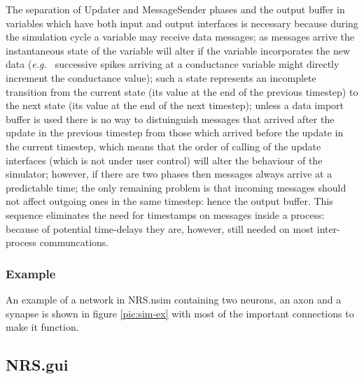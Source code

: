 \documentclass[pdftex,a4paper]{article}
\newif\ifpdf
\newcommand{\eg}{{\em e.g.\ }}
\begin{document}
The separation of Updater and MessageSender phases and the output
buffer in variables which have both input and output interfaces is
necessary because during the simulation cycle a variable may receive
data messages; as messages arrive the instantaneous state of the
variable will alter if the variable incorporates the new data (\eg
successive spikes arriving at a conductance variable might directly
increment the conductance value); such a state represents an
incomplete transition from the current state (its value at the end of
the previous timestep) to the next state (its value at the end of the
next timestep); unless a data import buffer is used there is no way
to distuinguish messages that arrived after the update in the previous
timestep from those which arrived before the update in the current
timestep, which means that the order of calling of the update
interfaces (which is not under user control) will alter the behaviour
of the simulator; however, if there are two phases then messages
always arrive at a predictable time; the only remaining problem is
that incoming messages should not affect outgoing ones in the same
timestep: hence the output buffer. This sequence eliminates the need
for timestamps on messages inside a process: because of potential
time-delays they are, however, still needed on most inter-process
communcations.

\subsubsection{Example}

An example of a network in NRS.nsim containing two neurons, an axon and
a synapse is shown in figure \ref{pic:sim-ex} with most of the
important connections to make it function.

\ifpdf
\begin{figure}[htb]
  \begin{center}
    \texttt{[image: example-sim.pdf]}
    \caption{An example of the construction of a network in NRS.nsim
    using NRS.gui: node names are inside their boxes, and Variables
    interfacing between nodes are in italics on the connection lines.}
    \label{pic:sim-ex}
  \end{center}
\end{figure}
\fi

\subsection{NRS.gui}
\end{document}
